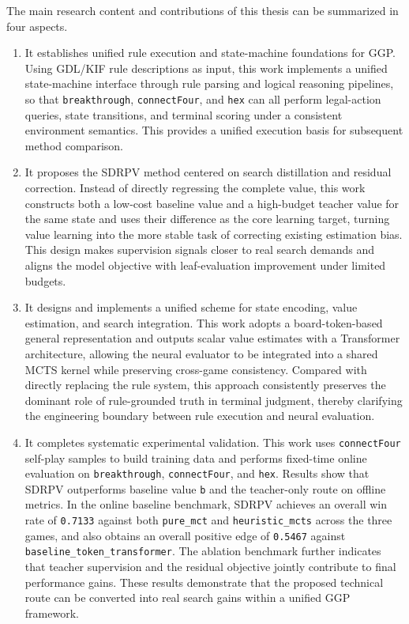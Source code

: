 The main research content and contributions of this thesis can be summarized in four aspects.

\begin{enumerate}
    \item It establishes unified rule execution and state-machine foundations for GGP. Using GDL/KIF rule descriptions as input, this work implements a unified state-machine interface through rule parsing and logical reasoning pipelines, so that \texttt{breakthrough}, \texttt{connectFour}, and \texttt{hex} can all perform legal-action queries, state transitions, and terminal scoring under a consistent environment semantics. This provides a unified execution basis for subsequent method comparison.

    \item It proposes the SDRPV method centered on search distillation and residual correction. Instead of directly regressing the complete value, this work constructs both a low-cost baseline value and a high-budget teacher value for the same state and uses their difference as the core learning target, turning value learning into the more stable task of correcting existing estimation bias. This design makes supervision signals closer to real search demands and aligns the model objective with leaf-evaluation improvement under limited budgets.

    \item It designs and implements a unified scheme for state encoding, value estimation, and search integration. This work adopts a board-token-based general representation and outputs scalar value estimates with a Transformer architecture, allowing the neural evaluator to be integrated into a shared MCTS kernel while preserving cross-game consistency. Compared with directly replacing the rule system, this approach consistently preserves the dominant role of rule-grounded truth in terminal judgment, thereby clarifying the engineering boundary between rule execution and neural evaluation.
    
    \item It completes systematic experimental validation. This work uses \texttt{connectFour} self-play samples to build training data and performs fixed-time online evaluation on \texttt{breakthrough}, \texttt{connectFour}, and \texttt{hex}. Results show that SDRPV outperforms baseline value \texttt{b} and the teacher-only route on offline metrics. In the online baseline benchmark, SDRPV achieves an overall win rate of \texttt{0.7133} against both \texttt{pure_mct} and \texttt{heuristic_mcts} across the three games, and also obtains an overall positive edge of \texttt{0.5467} against \texttt{baseline_token_transformer}. The ablation benchmark further indicates that teacher supervision and the residual objective jointly contribute to final performance gains. These results demonstrate that the proposed technical route can be converted into real search gains within a unified GGP framework.
\end{enumerate}

